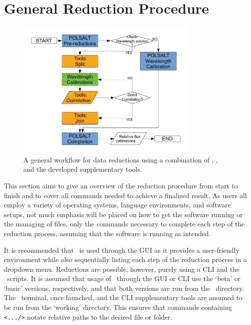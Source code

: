 \section{General Reduction Procedure}\label{sec:red_proc}

\begin{figure}[t]
    \centering
    \includegraphics[width = 0.8\textwidth]{figures/3_new_workflow.pdf}
    \caption{A general workflow for data reductions using a combination of \polsalt, \iraf, and the developed supplementary tools.}
    \label{fig:new_workflow}
\end{figure}

This section aims to give an overview of the reduction procedure from start to finish and to cover all commands needed to achieve a finalized result. As users all employ a variety of operating systems, language environments, and software setups, not much emphasis will be placed on how to get the software running or the managing of files, only the commands necessary to complete each step of the reduction process, assuming that the software is running as intended.
\prgph

It is recommended that \polsalt\ is used through the \gls{GUI} as it provides a user-friendly environment while also sequentially listing each step of the reduction process in a dropdown menu. Reductions are possible, however, purely using a \gls{CLI} and the \polsalt\ scripts. It is assumed that usage of \polsalt\ through the \gls{GUI} or \gls{CLI} use the `beta' or `basic' versions, respectively, and that both versions are run from the \polsalt\ directory. The \iraf\ terminal, once launched, and the \gls{CLI} supplementary tools are assumed to be run from the `working' directory. This ensures that commands containing \texttt{<.../>} notate relative paths to the desired file or folder.
\prgph

